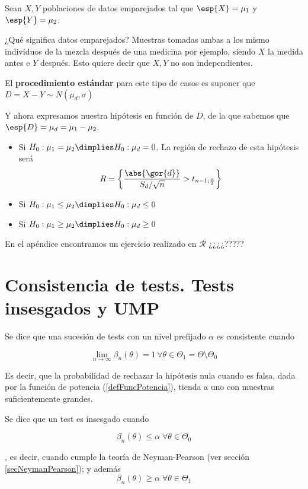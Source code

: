 \documentclass{apuntes}
\begin{document}
\begin{example}
Sean $X,Y$ poblaciones de datos emparejados  tal que $\esp{X} = \mu_1$ y $\esp{Y} = \mu_2$.


¿Qué significa datos emparejados? Muestras tomadas ambas a los mismo individuos de la mezcla después de una medicina por ejemplo, siendo $X$ la medida antes e $Y$ después. Esto quiere decir que $X,Y$ no son independientes.

El \textbf{procedimiento estándar} para este tipo de casos es suponer que $D =X-Y \sim N(\mu_d,\sigma)$

Y ahora expresamos nuestra hipótesis en función de $D$, de la que sabemos que $\esp{D} = \mu_d = \mu_1-\mu_2$.

\begin{itemize}
\item Si $H_0: \mu_1=\mu_2 \dimplies H_0: \mu_d=0 $. La región de rechazo de esta hipótesis será \[R = \left\{\frac{\abs{\gor{d}}}{S_d / \sqrt{n}} > t_{n-1;\frac{\alpha}{2}}\right\}\]
\item Si $H_0: \mu_1\leq\mu_2 \dimplies H_0: \mu_d\leq0 $
\item Si $H_0: \mu_1\geq\mu_2 \dimplies H_0: \mu_d\geq0 $
\end{itemize}
\end{example}
En el apéndice encontramos un ejercicio realizado en $\mathcal{R}$ ¿¿¿¿?????

\section{Consistencia de tests. Tests insesgados y UMP}

\begin{defn} Se dice que una sucesión de tests con un nivel prefijado $α$ es consistente cuando

\[ \lim_{n\to ∞} β_n(θ) = 1\,∀θ∈Θ_1= Θ\setminus Θ_0 \]

Es decir, que la probabilidad de rechazar la hipótesis nula cuando es falsa, dada por la función de potencia (\ref{defFuncPotencia}), tienda a uno con muestras suficientemente grandes.
\end{defn}


\begin{defn} Se dice que un test es insesgado cuando

\[ β_n(θ)≤α\;∀θ∈Θ_0 \]

, es decir, cuando cumple la teoría de Neyman-Pearson (ver sección \ref{secNeymanPearson}); y además \[ β_n(θ)≥α \;∀θ∈Θ_1 \]

\end{defn}
\end{document}
